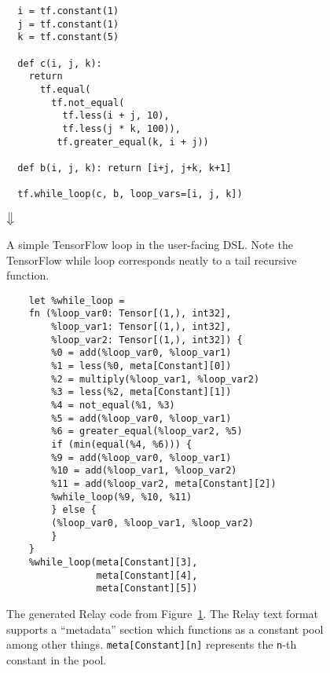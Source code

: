 \begin{figure}[htb!]
    \begin{verbatim}
  i = tf.constant(1)
  j = tf.constant(1)
  k = tf.constant(5)

  def c(i, j, k):
    return
      tf.equal(
        tf.not_equal(
          tf.less(i + j, 10),
          tf.less(j * k, 100)),
         tf.greater_equal(k, i + j))

  def b(i, j, k): return [i+j, j+k, k+1]

  tf.while_loop(c, b, loop_vars=[i, j, k])
    \end{verbatim}
         \begin{Huge}
    	    \hspace{3em} $\big\Downarrow$
         \end{Huge}
    \caption{
      A simple TensorFlow loop in the user-facing DSL.
      Note the TensorFlow while loop corresponds neatly to a tail recursive
        function.
    }
    \label{fig:tf_to_relay_loop_before}
    \end{figure}

\begin{figure}[htb!]
\begin{verbatim}
    let %while_loop =
    fn (%loop_var0: Tensor[(1,), int32],
        %loop_var1: Tensor[(1,), int32],
        %loop_var2: Tensor[(1,), int32]) {
        %0 = add(%loop_var0, %loop_var1)
        %1 = less(%0, meta[Constant][0])
        %2 = multiply(%loop_var1, %loop_var2)
        %3 = less(%2, meta[Constant][1])
        %4 = not_equal(%1, %3)
        %5 = add(%loop_var0, %loop_var1)
        %6 = greater_equal(%loop_var2, %5)
        if (min(equal(%4, %6))) {
        %9 = add(%loop_var0, %loop_var1)
        %10 = add(%loop_var1, %loop_var2)
        %11 = add(%loop_var2, meta[Constant][2])
        %while_loop(%9, %10, %11)
        } else {
        (%loop_var0, %loop_var1, %loop_var2)
        }
    }
    %while_loop(meta[Constant][3],
                meta[Constant][4],
                meta[Constant][5])
    \end{verbatim}
    \caption{
        The generated Relay code from Figure~\ref{fig:tf_to_relay_loop_before}.
        The Relay text format supports a ``metadata'' section which functions
        as a constant pool among other things.
        \texttt{meta[Constant][n]} represents the \texttt{n}-th constant in the
        pool.
    }
    \label{fig:tf_to_relay_loop_after}
    \end{figure}
